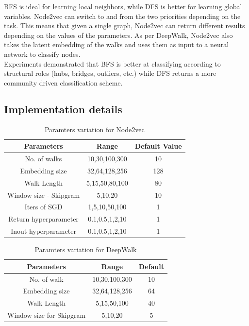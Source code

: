 \documentclass[sigconf]{acmart}
\begin{document}
BFS is ideal for learning local neighbors, while DFS is better for learning global variables. Node2vec can switch to and from the two priorities depending on the task. This means that given a single graph, Node2vec can return different results depending on the values of the parameters. As per DeepWalk, Node2vec also takes the latent embedding of the walks and uses them as input to a neural network to classify nodes. \\

Experiments demonstrated that BFS is better at classifying according to structural roles (hubs, bridges, outliers, etc.) while DFS returns a more community driven classification scheme.

\subsection{Implementation details}

\begin{table}[h]
\begin{center}
\begin{tabular}{ c|c|c } 
 \textbf{Parameters} & \textbf{Range} & \textbf{Default Value} \\ 
 \hline
 No. of walks & 10,30,100,300 & 10 \\
 Embedding size & 32,64,128,256 & 128 \\ 
 Walk Length & 5,15,50,80,100 & 80 \\ 
 Window size - Skipgram & 5,10,20 & 10 \\ 
 Iters of SGD & 1,5,10,50,100 & 1 \\ 
 Return hyperparameter & 0.1,0.5,1,2,10 & 1 \\ 
 Inout hyperparameter & 0.1,0.5,1,2,10 & 1 \\ 
\end{tabular}
\end{center}
\caption{Paramters variation for Node2vec}
\label{tab:node2vec_param}
\end{table}

\begin{table}[h]
\begin{center}
\begin{tabular}{ c|c|c } 
 \textbf{Parameters} & \textbf{Range} & \textbf{Default} \\ 
 \hline
 No. of walk & 10,30,100,300 & 10 \\
 Embedding size & 32,64,128,256 & 64 \\ 
 Walk Length & 5,15,50,100 & 40 \\ 
 Window size for Skipgram & 5,10,20 & 5 \\ 

\end{tabular}
\end{center}
\caption{Paramters variation for DeepWalk}
\label{tab:deepwalk_param}
\end{table}
\end{document}

